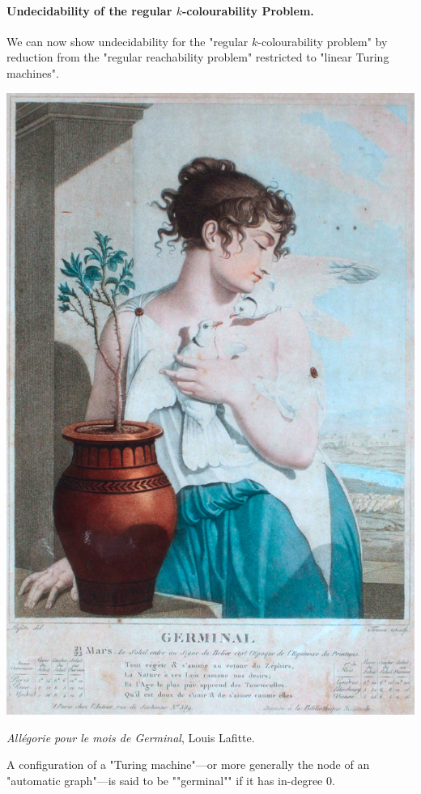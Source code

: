 \paragraph*{Undecidability of the regular $k$-colourability Problem.}
We can now show undecidability for the "regular $k$-colourability problem" by reduction from the "regular reachability problem" restricted to "linear Turing machines".

\begin{marginfigure}
    \centering
    \includegraphics[width=\linewidth]{fig/germinal.jpg}
    \caption{\emph{Allégorie pour le mois de Germinal}, Louis Lafitte.}
\end{marginfigure}

A configuration of a "Turing machine"---or more generally the node of an
"automatic graph"---is said 
to be \AP""germinal"" if it has in-degree 0.%

